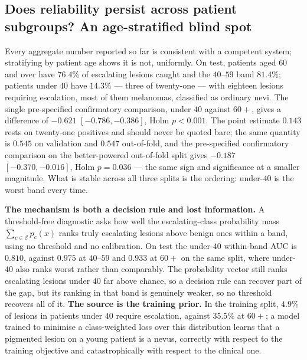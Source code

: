\documentclass[journal]{IEEEtran}
\begin{document}
\subsection{Does reliability persist across patient subgroups? An age-stratified blind spot}
\label{sec:results-fairness}



Every aggregate number reported so far is consistent with a competent system; stratifying by
patient age shows it is not, uniformly. On test, patients aged $60$ and over have $76.4\%$ of
escalating lesions caught and the $40$--$59$ band $81.4\%$; patients under $40$ have $14.3\%$
--- three of twenty-one --- with eighteen lesions requiring escalation, most of them
melanomas, classified as ordinary nevi. The single pre-specified confirmatory comparison,
under $40$ against $60+$, gives a difference of $-0.621$ $[-0.786,-0.386]$, Holm $p<0.001$. The
point estimate $0.143$ rests on twenty-one positives and should never be quoted bare; the same
quantity is $0.545$ on validation and $0.547$ out-of-fold, and the pre-specified confirmatory
comparison on the better-powered out-of-fold split gives $-0.187$ $[-0.370,-0.016]$, Holm
$p=0.036$ --- the same sign and significance at a smaller magnitude. What is stable across all
three splits is the ordering: under-$40$ is the worst band every time.

\textbf{The mechanism is both a decision rule and lost information.} A threshold-free
diagnostic asks how well the escalating-class probability mass $\sum_{c\in\mathcal{E}}p_c(x)$
ranks truly escalating lesions above benign ones within a band, using no threshold and no
calibration. On test the under-$40$ within-band AUC is $0.810$, against $0.975$ at $40$--$59$
and $0.933$ at $60+$ on the same split, where under-$40$ also ranks worst rather than
comparably. The probability vector still ranks escalating lesions under $40$ far above chance,
so a decision rule can recover part of the gap, but its ranking in that band is genuinely
weaker, so no threshold recovers all of it. \textbf{The source is the training prior.} In the
training split, $4.9\%$ of lesions in patients under $40$ require escalation, against $35.5\%$
at $60+$; a model trained to minimise a class-weighted loss over this distribution learns that
a pigmented lesion on a young patient is a nevus, correctly with respect to the training
objective and catastrophically with respect to the clinical one.
\end{document}
